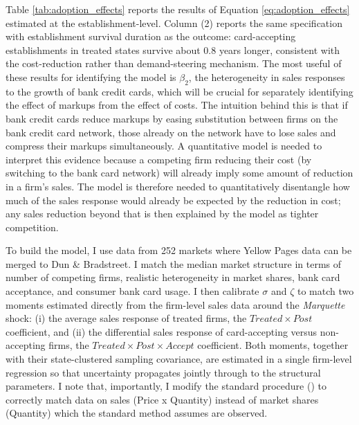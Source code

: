 \documentclass[12pt,english]{article}
\begin{document}
Table \ref{tab:adoption_effects} reports the results of Equation \ref{eq:adoption_effects} estimated at the establishment-level. Column (2) reports the same specification with establishment survival duration as the outcome: card-accepting establishments in treated states survive about 0.8 years longer, consistent with the cost-reduction rather than demand-steering mechanism. The most useful of these results for identifying the model is $\beta_2$, the heterogeneity in sales responses to the growth of bank credit cards, which will be crucial for separately identifying the effect of markups from the effect of costs. The intuition behind this is that if bank credit cards reduce markups by easing substitution between firms on the bank credit card network, those already on the network have to lose sales and compress their markups simultaneously. A quantitative model is needed to interpret this evidence because a competing firm reducing their cost (by switching to the bank card network) will already imply some amount of reduction in a firm's sales. The model is therefore needed to quantitatively disentangle how much of the sales response would already be expected by the reduction in cost; any sales reduction beyond that is then explained by the model as tighter competition. 

To build the model, I use data from 252 markets where Yellow Pages data can be merged to Dun \& Bradstreet. I match the median market structure in terms of number of competing firms, realistic heterogeneity in market shares, bank card acceptance, and consumer bank card usage. I then calibrate $\sigma$ and $\zeta$ to match two moments estimated directly from the firm-level sales data around the \emph{Marquette} shock: (i) the average sales response of treated firms, the $Treated\times Post$ coefficient, and (ii) the differential sales response of card-accepting versus non-accepting firms, the $Treated\times Post\times Accept$ coefficient. Both moments, together with their state-clustered sampling covariance, are estimated in a single firm-level regression so that uncertainty propagates jointly through to the structural parameters. %
I note that, importantly, I modify the standard procedure (\cite{miller_notes_2019}) to correctly match data on sales (Price x Quantity) instead of market shares (Quantity) which the standard method assumes are observed.

\end{document}
